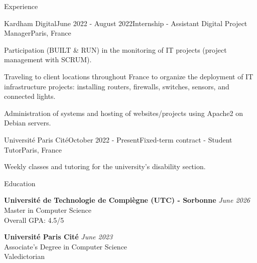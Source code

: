\documentclass[
	10pt,
]{style} %
\begin{document}
\begin{rSection}{Experience}
	\begin{rSubsection}{Kardham Digital}{June 2022 - August 2022}{Internship - Assistant Digital Project Manager}{Paris, France}
		\item Participation (BUILT \& RUN) in the monitoring of IT projects (project management with SCRUM).
		\item Traveling to client locations throughout France to organize the deployment of IT infrastructure projects: installing routers, firewalls, switches, sensors, and connected lights.
		\item Administration of systems and hosting of websites/projects using Apache2 on Debian servers.
	\end{rSubsection}


	\begin{rSubsection}{Université Paris Cité}{October 2022 - Present}{Fixed-term contract - Student Tutor}{Paris, France}
		\item Weekly classes and tutoring for the university's disability section.
	\end{rSubsection}

\end{rSection}


\begin{rSection}{Education}

	\textbf{Université de Technologie de Compiègne (UTC) - Sorbonne} \hfill \textit{June 2026} \\
	Master in Computer Science \\
	Overall GPA: 4.5/5

	\textbf{Université Paris Cité} \hfill \textit{June 2023} \\
	Associate's Degree in Computer Science \\
	Valedictorian

\end{rSection}

\end{document}
